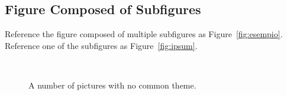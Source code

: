 \documentclass[
10pt, %
a4paper, %
oneside, %
headinclude,footinclude, %
BCOR5mm, %
]{scrartcl}
\begin{document}

\subsection{Figure Composed of Subfigures}

Reference the figure composed of multiple subfigures as Figure~\vref{fig:esempio}. Reference one of the subfigures as Figure~\vref{fig:ipsum}. %

\lipsum[15-18] %

\begin{figure}[tb]
\centering
{} \quad
{} \\
 \quad
{}
\caption[A number of pictures.]{A number of pictures with no common theme.} %
\label{fig:esempio}
\end{figure}


\renewcommand{\refname}{\spacedlowsmallcaps{References}} %




\end{document}
